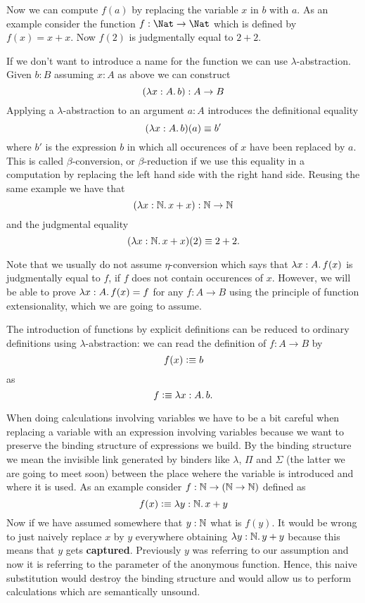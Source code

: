 Now we can compute $f(a)$ by replacing the variable $x$ in $b$ with
$a$. As an example consider the function $f : \Nat \to \Nat$ which is
defined by $f(x) = x+x$. Now $f(2)$ is judgmentally equal to $2+2$.

If we don't want to introduce a name for the function we can use
$\lambda$-abstraction. Given $b : B$ assuming $x:A$ as above we can
construct 
\[ (\lam{x:A}b) : A \to B \]
Applying a $\lambda$-abstraction to an argument $a:A$ introduces the
definitional equality 
\[(\lam{x:A}b)(a) \jdeq b'\]
 where $b'$ is the
expression $b$ in which all occurences of $x$ have been replaced by $a$.
This is called $\beta$-conversion, or $\beta$-reduction if we use this
equality in a computation by replacing the left hand side with the
right hand side. Reusing the same example we have that
\[ (\lam{x:\nat}x+x) : \nat \to \nat \]
and the judgmental equality
\[ (\lam{x:\nat}x+x)(2) \jdeq 2+2. \]

Note that we usually do not assume $\eta$-conversion which says that $\lam{x:A}f(x)$ is judgmentally equal to $f$, if $f$ does not contain occurences of $x$. However, we will be able to prove $\lam{x:A} f(x) = f$ for any $f:A \to B$ using the principle of function extensionality, which we are going to assume.

The introduction of functions by explicit definitions can be reduced
to ordinary definitions using $\lambda$-abstraction: we can read 
the definition of $f: A\to B$ by
\[ f(x) \vcentcolon\equiv b \]
as 
\[ f \defeq \lam{x:A}b .\]

When doing calculations involving variables we have to be a bit
careful when replacing a variable with an expression involving
variables because we want to preserve the binding structure of
expressions we build. By the binding structure we mean the
invisible link generated by binders like $\lambda$, $\Pi$ and
$\Sigma$ (the latter we are going to meet soon) between the place wehere the variable is introduced and where it is used. As an example consider $f : \mathbb{N} \to (\mathbb{N} \to \mathbb{N})$
defined as 
\[ f(x) \defeq \lam{y:\nat} x + y \] 
Now if we have assumed somewhere that $y : \mathbb{N}$ what is $f(y)$. It would be wrong to just naively replace $x$ by $y$ everywhere obtaining $\lam{y:\nat} y + y$ because this means that $y$ gets \textbf{captured}. Previously $y$ was referring to our assumption and now it is referring to the parameter of the anonymous function. Hence, this naive substitution would destroy the binding structure and would allow us to perform calculations which are semantically unsound.

